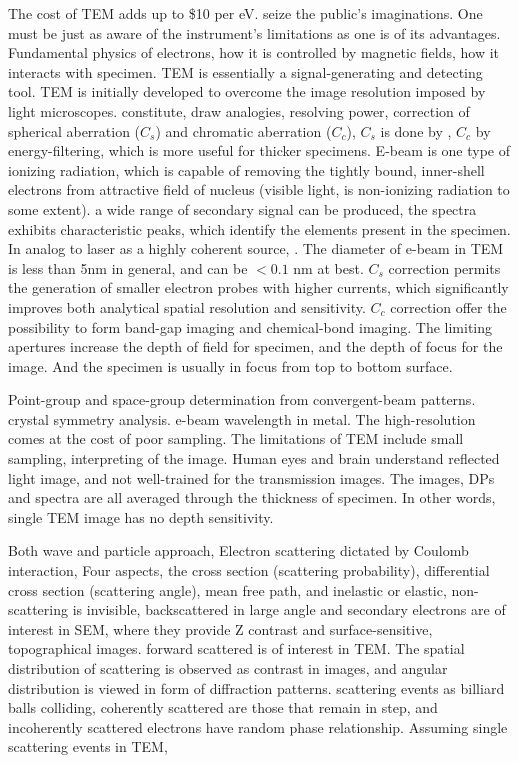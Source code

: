 The cost of TEM adds up to \$10 per eV. seize the public's imaginations. One must be just as aware of the instrument's limitations as one is of its advantages. Fundamental physics of electrons, how it is controlled by magnetic fields, how it interacts with specimen. TEM is essentially a signal-generating and detecting tool. TEM is initially developed to overcome the image resolution imposed by light microscopes. constitute, draw analogies, resolving power, correction of spherical aberration ($C_s$) and chromatic aberration ($C_c$), $C_s$ is done by , $C_c$ by energy-filtering, which is more useful for thicker specimens. E-beam is one type of ionizing radiation, which is capable of removing the tightly bound, inner-shell electrons from attractive field of nucleus (visible light, is non-ionizing radiation to some extent). a wide range of secondary signal can be produced, the spectra exhibits characteristic peaks, which identify the elements present in the specimen. In analog to laser as a highly coherent source, . The diameter of e-beam in TEM is less than 5nm in general, and can be $< 0.1$ nm at best. $C_s$ correction permits the generation of smaller electron probes with higher currents, which significantly improves both analytical spatial resolution and sensitivity. $C_c$ correction offer the possibility to form band-gap imaging and chemical-bond imaging. The limiting apertures increase the depth of field for specimen, and the depth of focus for the image. And the specimen is usually in focus from top to bottom surface.\cite{Williams2009}

Point-group and space-group determination from convergent-beam patterns. crystal symmetry analysis. e-beam wavelength in metal. The high-resolution comes at the cost of poor sampling. The limitations of TEM include small sampling, interpreting of the image. Human eyes and brain understand reflected light image, and not well-trained for the transmission images. The images, DPs and spectra are all averaged through the thickness of specimen. In other words, single TEM image has no depth sensitivity. 

Both wave and particle approach, Electron scattering dictated by Coulomb interaction, Four aspects, the cross section (scattering probability), differential cross section (scattering angle), mean free path, and inelastic or elastic, non-scattering is invisible, backscattered in large angle and secondary electrons are of interest in SEM, where they provide Z contrast and surface-sensitive, topographical images. forward scattered is of interest in TEM. The spatial distribution of scattering is observed as contrast in images, and angular distribution is viewed in form of diffraction patterns. scattering events as billiard balls colliding, coherently scattered are those that remain in step, and incoherently scattered electrons have random phase relationship. Assuming single scattering events in TEM, 

